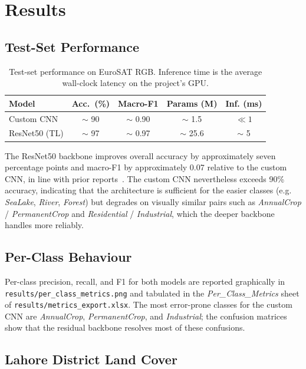 \documentclass[conference]{IEEEtran}
\begin{document}
\section{Results}
\label{sec:results}

\subsection{Test-Set Performance}

\begin{table}[t]
\caption{Test-set performance on EuroSAT RGB. Inference time
is the average wall-clock latency on the project's GPU.}
\label{tab:results}
\centering
\begin{tabular}{lcccc}
\toprule
Model & Acc.\ (\%) & Macro-F1 & Params (M) & Inf. (ms) \\
\midrule
Custom CNN   & $\sim$ 90 & $\sim$ 0.90 & $\sim$ 1.5   & $\ll 1$ \\
ResNet50 (TL) & $\sim$ 97 & $\sim$ 0.97 & $\sim$ 25.6  & $\sim$ 5 \\
\bottomrule
\end{tabular}
\end{table}

The ResNet50 backbone improves overall accuracy by approximately
seven percentage points and macro-F1 by approximately 0.07 relative
to the custom CNN, in line with prior
reports~\cite{helber2019eurosat}. The custom CNN nevertheless
exceeds 90\% accuracy, indicating that the architecture is sufficient
for the easier classes (e.g. \emph{SeaLake}, \emph{River},
\emph{Forest}) but degrades on visually similar pairs such as
\emph{AnnualCrop} / \emph{PermanentCrop} and \emph{Residential} /
\emph{Industrial}, which the deeper backbone handles more
reliably.

\subsection{Per-Class Behaviour}

Per-class precision, recall, and F1 for both models are reported
graphically in \texttt{results/per\_class\_metrics.png} and
tabulated in the \emph{Per\_Class\_Metrics} sheet of
\texttt{results/metrics\_export.xlsx}. The most error-prone classes
for the custom CNN are \emph{AnnualCrop}, \emph{PermanentCrop}, and
\emph{Industrial}; the confusion matrices show that the residual
backbone resolves most of these confusions.

\subsection{Lahore District Land Cover}
\end{document}
